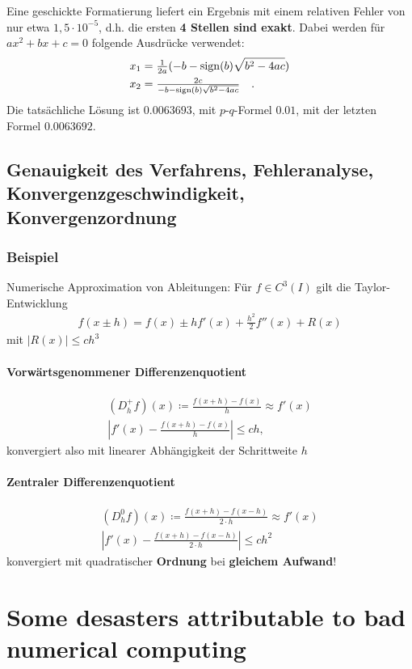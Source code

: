 Eine geschickte Formatierung liefert ein Ergebnis mit einem
relativen Fehler von nur etwa $1,5 \cdot 10^{-5}$,
d.h. die ersten \textbf{4 Stellen sind exakt}. 
Dabei werden für $ax^2 + bx + c = 0$ folgende Ausdrücke verwendet:
\begin{align*}
  x_1 &= \tfrac{1}{2a}(-b-\operatorname{sign}(b)\sqrt{b^2-4ac})\\
  x_2 &= \tfrac{2c}{- b - \operatorname{sign}(b)\sqrt{b^2-4ac}} \quad .
\end{align*}
Die tatsächliche Lösung ist $0.0063693$, mit $p$-$q$-Formel $0.01$,
mit der letzten Formel $0.0063692$.

\subsection*{Genauigkeit des Verfahrens, Fehleranalyse,
  Konvergenzgeschwindigkeit, Konvergenzordnung}

\subsubsection{Beispiel}
Numerische Approximation von Ableitungen:
Für $f \in C^3(I)$ gilt die Taylor-Entwicklung
\begin{gather*}
  f(x \pm h) = f(x) \pm h f'(x)+\frac{h^2}{2}f''(x)+R(x)
\end{gather*}
mit $|R(x)| \leq ch^3$

\paragraph{Vorwärtsgenommener Differenzenquotient}
\begin{gather*}
  (D_h^+f)(x) \coloneqq \frac{f(x + h) - f(x)}{h} \approx f'(x) \\
  \left| f'(x) - \frac{f(x + h) - f(x)}{h}\right| \leq c h,  
\end{gather*}
konvergiert also mit linearer Abhängigkeit der
Schrittweite $h$  
\paragraph{Zentraler Differenzenquotient}
\begin{gather*}
  (D_h^0f)(x)\coloneqq \frac{f(x+h)-f(x-h)}{2\cdot h}\approx f'(x)\\
  \left| f'(x)-\frac{f(x+h)-f(x-h)}{2\cdot h}\right| \leq ch^2
\end{gather*}
konvergiert mit quadratischer \textbf{Ordnung} bei
\textbf{gleichem Aufwand}!


\section*{Some desasters attributable to bad numerical computing}

